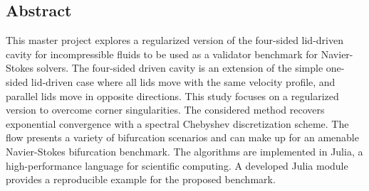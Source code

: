 
\begin{center}
\section*{Abstract}
\end{center} 

This master project explores a regularized version of the four-sided lid-driven
cavity for incompressible fluids to be used as a validator benchmark for
Navier-Stokes solvers. The four-sided driven cavity is an extension of the
simple one-sided lid-driven case where all lids move with the same velocity
profile, and parallel lids move in opposite directions. This study focuses on a
regularized version to overcome corner singularities. The considered method
recovers exponential convergence with a spectral Chebyshev discretization
scheme. The flow presents a variety of bifurcation scenarios and can make up
for an amenable Navier-Stokes bifurcation benchmark. The algorithms are
implemented in Julia, a high-performance language for scientific computing. A
developed Julia module provides a reproducible example for the proposed
benchmark.

